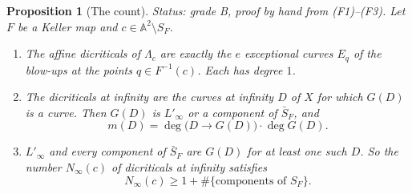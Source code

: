 \documentclass[a4paper,11pt]{article}
\theoremstyle{plain}
\newtheorem{proposition}[theorem]{Proposition}
\theoremstyle{definition}
\theoremstyle{remark}
\begin{document}
\begin{proposition}[The count]\label{prop:count}
\textit{Status: grade B, proof by hand from \textnormal{(F1)--(F3)}.}
Let $F$ be a Keller map and $c \in \mathbb{A}^2 \setminus S_F$.
\begin{enumerate}[label=(\alph*),nosep]
\item The affine dicriticals of $\Lambda_c$ are exactly the $e$ exceptional curves $E_q$ of
the blow-ups at the points $q \in F^{-1}(c)$. Each has degree $1$.
\item The dicriticals at infinity are the curves at infinity $D$ of $X$ for which $G(D)$ is a
curve. Then $G(D)$ is $L'_\infty$ or a component of $\bar{S}_F$, and
\begin{equation}\label{eq:count-degree}
m(D) = \deg\big(D \to G(D)\big) \cdot \deg G(D).
\end{equation}
\item $L'_\infty$ and every component of $\bar{S}_F$ are $G(D)$ for at least one such $D$.
So the number $N_\infty(c)$ of dicriticals at infinity satisfies
\begin{equation}\label{eq:count-lower}
N_\infty(c) \geq 1 + \#\{\text{components of } S_F\}.
\end{equation}
\end{enumerate}
\end{proposition}
\end{document}
